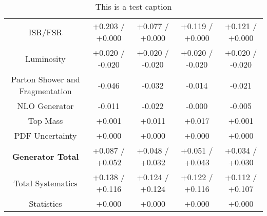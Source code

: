 \begin{table}[htbp]
\begin{center}
\begin{tabular}{|c|c|c|c|c|}
ISR/FSR                               &+0.203   / +0.000   & +0.077   / +0.000   & +0.119   / +0.000   & +0.121   / +0.000  \\
Luminosity                            &+0.020   / -0.020   & +0.020   / -0.020   & +0.020   / -0.020   & +0.020   / -0.020  \\
Parton Shower and Fragmentation       &-0.046              & -0.032              & -0.014              & -0.021             \\
NLO Generator                         &-0.011              & -0.022              & -0.000              & -0.005             \\
Top Mass                              &+0.001              & +0.011              & +0.017              & +0.001             \\
PDF Uncertainty                       &+0.000              & +0.000              & +0.000              & +0.000             \\
\hline
\textbf{Generator Total}              &+0.087   / +0.052   & +0.048   / +0.032   & +0.051   / +0.043   & +0.034   / +0.030  \\
\hline
\hline
Total Systematics                     &+0.138   / +0.116   & +0.124   / +0.124   & +0.122   / +0.116   & +0.112   / +0.107  \\
Statistics                            &+0.000              & +0.000              & +0.000              & +0.000             \\
\hline
  \end{tabular}
  \end{center} 
  \label{tab:xsec_nominal_coscos_op_low}
  \caption{This is a test caption}
\end{table}



\clearpage

